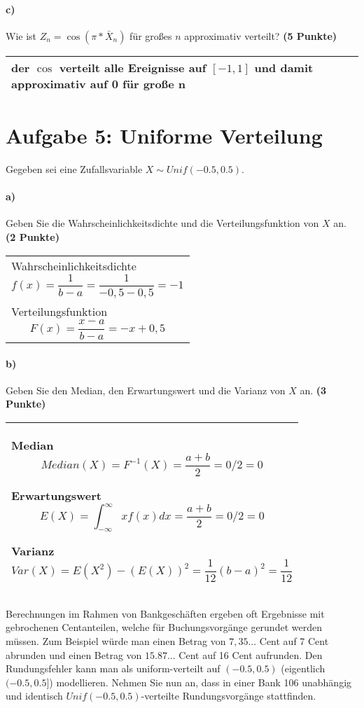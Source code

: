 \documentclass[10pt, a4paper]{article}
\begin{document}
\paragraph{c)} Wie ist $Z_n= \cos(\pi*\bar{X}_n)$ für großes $n$ approximativ verteilt? \textbf{(5 Punkte)}\\
\begin{tabular}{| p{17cm} |}
    \hline
    der $\cos$ verteilt alle Ereignisse auf $[-1,1]$ und damit approximativ auf 0 für große n
    \\\hline
\end{tabular}

\section{Aufgabe 5: Uniforme Verteilung}
Gegeben sei eine Zufallsvariable $X\sim Unif(-0.5,0.5)$.
\paragraph{a)} Geben Sie die Wahrscheinlichkeitsdichte und die Verteilungsfunktion von $X$ an. \textbf{(2 Punkte)}\\
\begin{tabular}{| p{17cm} |}
    \hline
    Wahrscheinlichkeitsdichte $$f(x)=\frac{1}{b-a} = \frac{1}{-0,5 - 0,5} = -1$$ \\
    Verteilungsfunktion $$F(x)=\frac{x-a}{b-a} = -x+0,5$$
    \\\hline
\end{tabular}

\paragraph{b)} Geben Sie den Median, den Erwartungswert und die Varianz von $X$ an. \textbf{(3 Punkte)}\\
\begin{tabular}{| p{17cm} |}
    \hline
    Median $$Median(X)=F^{-1}(X)=\frac{a+b}{2}= 0/2 = 0$$

    Erwartungswert $$E(X)=\int_{-\infty}^{\infty} xf(x) dx = \frac{a+b}{2} = 0/2 = 0$$

    Varianz $$Var(X)=E(X^2)-(E(X))^2 = \frac{1}{12}(b-a)^2 = \frac{1}{12}$$
    \\\hline
\end{tabular}
\newline
Berechnungen im Rahmen von Bankgeschäften ergeben oft Ergebnisse mit gebrochenen Centanteilen, welche für Buchungsvorgänge gerundet werden müssen. Zum Beispiel würde man einen Betrag von $7,35...$ Cent auf 7 Cent abrunden und einen Betrag von $15.87...$ Cent auf 16 Cent aufrunden. Den Rundungsfehler kann man als uniform-verteilt auf $(-0.5,0.5)$ (eigentlich $(-0.5,0.5]$) modellieren. Nehmen Sie nun an, dass in einer Bank 106 unabhängig und identisch $Unif(-0.5,0.5)$-verteilte Rundungsvorgänge stattfinden.
\end{document}
